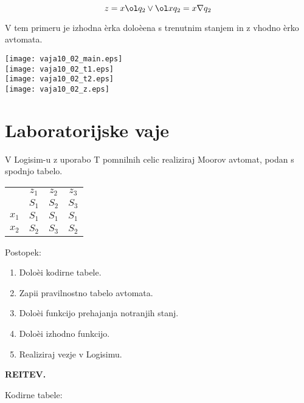 \begin{zgled}
$$
z = x \ol q_2 \vee \ol x q_2 = x \nabla q_2
$$

V tem primeru je izhodna èrka doloèena s trenutnim stanjem in z vhodno èrko avtomata.

\bigskip

\texttt{[image: vaja10\_02\_main.eps]} \\
\texttt{[image: vaja10\_02\_t1.eps]} \\
\texttt{[image: vaja10\_02\_t2.eps]} \\
\texttt{[image: vaja10\_02\_z.eps]} \\

\end{zgled}

\newpage

\section*{Laboratorijske vaje}
V Logisim-u z uporabo T pomnilnih celic realiziraj Moorov avtomat, podan s spodnjo tabelo.

\bigskip
\begin{center}
\large
\begin{tabular}{c|ccc}
& $z_1$ & $z_2$ & $z_3$\\
& $S_1$ & $S_2$ & $S_3$\\
\hline
$x_1$ & $S_1$ & $S_1$ & $S_1$\\
$x_2$ & $S_2$ & $S_3$ & $S_2$\\
\end{tabular}
\end{center}

\bigskip
Postopek:
\begin{enumerate}
\item Doloèi kodirne tabele.
\item Zapii pravilnostno tabelo avtomata.
\item Doloèi funkcijo prehajanja notranjih stanj.
\item Doloèi izhodno funkcijo.
\item Realiziraj vezje v Logisimu.
\end{enumerate}

\bigskip
\textbf{REITEV.}

\bigskip
Kodirne tabele:

